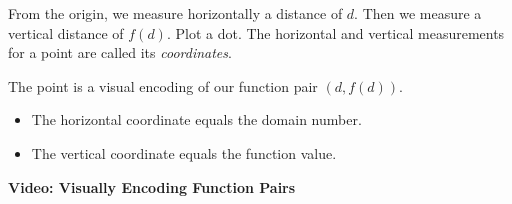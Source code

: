 \documentclass{ximera}
\begin{document}
From the origin, we measure horizontally a distance of $d$.  Then we measure a vertical distance of $f(d)$. Plot a dot. The horizontal and vertical measurements for a point are called its \textit{coordinates}.


The point is a visual encoding of our function pair $(d, f(d))$.

\begin{itemize}
\item The horizontal coordinate equals the domain number.
\item The vertical coordinate equals the function value.
\end{itemize}






\begin{explanation} \textbf{\textcolor{red!75!green}{Video: Visually Encoding Function Pairs}}

\begin{onlineOnly}
\begin{expandable} 

\begin{center}
\end{center}

\end{expandable}
\end{onlineOnly}

\end{explanation}
\end{document}
